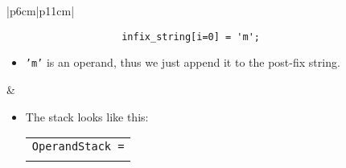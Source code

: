 \begin{center}
    \begin{longtable}{ |p{6cm}|p{11cm}| }
        \hline
        \hline
             \\
        
        \hline
        \hline
            {
                \begin{verbatim}
                    infix_string[i=0] = 'm';
                \end{verbatim}
            }
            \begin{itemize}
                \item \texttt{'m'} is an operand, thus we just  append it to the post-fix string. 
            \end{itemize}
            &  
                \begin{itemize}
                    \item The stack looks like this: 
                        {
                        \begin{center}
                            \begin{tabular}{ c }
                                \texttt{OperandStack =} \\ \\
                            \end{tabular}
                            \begin{bytefield}{10}
                                 \\
                            \end{bytefield}
                        \end{center}
                        }
                    

\end{itemize}
\end{longtable}
\end{center}
